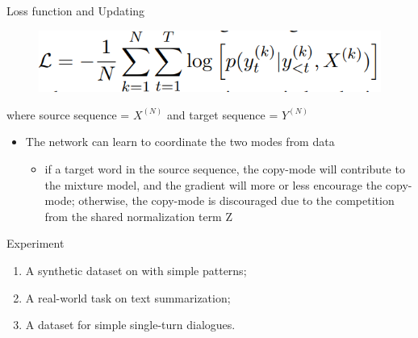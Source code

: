 \documentclass{beamer}
\begin{document}
\begin{frame}{Loss function and Updating}
    \begin{figure}
        \centering
        \includegraphics[scale = 0.85]{loss.PNG}
    \end{figure}
    where source sequence = $X^{(N)}$ and target sequence = $Y^{(N)}$
    \begin{itemize}
        \item  The network can learn to coordinate
the two modes from data
        \begin{itemize}
            \item if a target word in the source sequence, the copy-mode will contribute
        to the mixture model, and the gradient will
        more or less encourage the copy-mode; otherwise,
        the copy-mode is discouraged due to the competition
        from the shared normalization term Z
        \end{itemize}
    \end{itemize}
\end{frame}

\begin{frame}{Experiment}
    \begin{enumerate}
        \item A synthetic dataset on with simple patterns;
        \item A real-world task on text summarization;
        \item A dataset for simple single-turn dialogues.
    \end{enumerate}
\end{frame}
\end{document}
